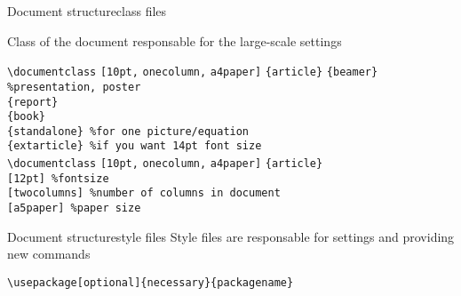 \begin{frame}[fragile]{Document structure}{class files}

Class of the document responsable for the large-scale settings
    \cprotect{} 
{
\scriptsize
\begin{tabbing}
\lstinline|\documentclass|\hspace{-1ex} \= \lstinline|[10pt,|  \= \lstinline|onecolumn,|  \=  \lstinline|a4paper]|\hspace{-1ex} \= \lstinline|{article}| \kill
\> \> \> \> \lstinline|{beamer} %presentation, poster| \\
\> \> \> \> \lstinline|{report}| \\
\> \> \> \> \lstinline|{book}| \\
\> \> \> \> \lstinline|{standalone} %for one picture/equation| \\
\> \> \> \> \lstinline|{extarticle} %if you want 14pt font size| \\
\lstinline|\documentclass| \> \lstinline|[10pt,|  \> \lstinline|onecolumn,|  \>  \lstinline|a4paper]| \> \lstinline|{article}| \\ 
\> \lstinline|[12pt] %fontsize| \> \\ 
\> \> \lstinline|[twocolumns] %number of columns in document| \> \\ 
\> \> \> \lstinline|[a5paper] %paper size| \> \\ 
\end{tabbing}}
\cprotect{}
\end{frame}

\begin{frame}[fragile]{Document structure}{style files}
     Style files are responsable for settings and providing new commands 
     
     \vfill
     \hspace{-1ex}
     \lstinline[basicstyle=\tt\large]|\usepackage[optional]{necessary}{packagename}|
     \vfill
\end{frame}



\cprotect{}